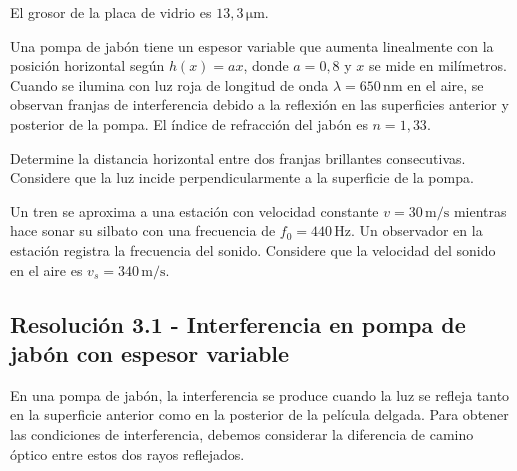 \documentclass[
  11pt,
  letterpaper,
   addpoints,
   answers
  ]{exam}
\begin{document}
\begin{questions}
\begin{solution}
El grosor de la placa de vidrio es $\boxed{13{,}3\,\mathrm{\mu m}}$.

\end{solution}
\question Una pompa de jabón tiene un espesor variable que aumenta linealmente con la posición horizontal según $h(x) = ax$, donde $a = 0{,}8$ y $x$ se mide en milímetros. Cuando se ilumina con luz roja de longitud de onda $\lambda = 650\,\mathrm{nm}$ en el aire, se observan franjas de interferencia debido a la reflexión en las superficies anterior y posterior de la pompa. El índice de refracción del jabón es $n = 1{,}33$.

Determine la distancia horizontal entre dos franjas brillantes consecutivas. Considere que la luz incide perpendicularmente a la superficie de la pompa.

\question Un tren se aproxima a una estación con velocidad constante $v = 30\,\mathrm{m/s}$ mientras hace sonar su silbato con una frecuencia de $f_0 = 440\,\mathrm{Hz}$. Un observador en la estación registra la frecuencia del sonido. Considere que la velocidad del sonido en el aire es $v_s = 340\,\mathrm{m/s}$.

\begin{solution}
\subsection*{Resolución 3.1 - Interferencia en pompa de jabón con espesor variable}

En una pompa de jabón, la interferencia se produce cuando la luz se refleja tanto en la superficie anterior como en la posterior de la película delgada. Para obtener las condiciones de interferencia, debemos considerar la diferencia de camino óptico entre estos dos rayos reflejados.


\end{solution}
\end{questions}
\end{document}
